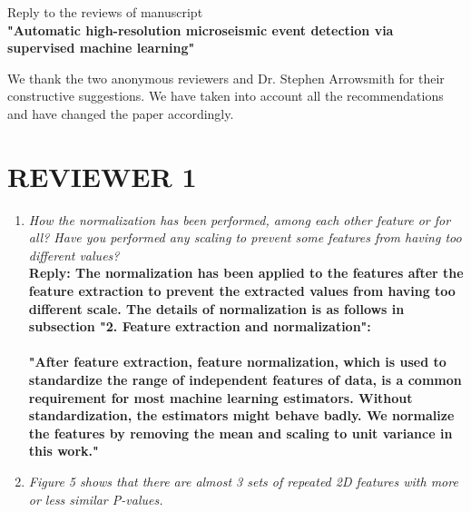 
\begin{center}
Reply to the reviews of manuscript\\

\textbf{"Automatic high-resolution microseismic event detection via supervised machine learning"}\\

\end{center}

We thank the two anonymous reviewers and Dr. Stephen Arrowsmith for their constructive suggestions. We have taken into account all the recommendations and have changed the paper accordingly.

\section{REVIEWER 1}
\begin{enumerate}
\item \textsl{How the normalization has been performed, among each other feature or for all? Have you performed any scaling to prevent some features from having too different values?}\\

\textbf{Reply: The normalization has been applied to the features after the feature extraction to prevent the extracted values from having too different scale. The details of normalization is as follows in subsection "2. Feature extraction and normalization": \\ \\
"After feature extraction, feature normalization, which is used to standardize the range of independent features of data, is a common requirement for most machine learning estimators. Without standardization, the estimators might behave badly. We normalize the features by removing the mean and scaling to unit variance in this work."}

\item \textsl{Figure 5 shows that there are almost 3 sets of repeated 2D features with more or less similar P-values.}\\


\end{enumerate}
